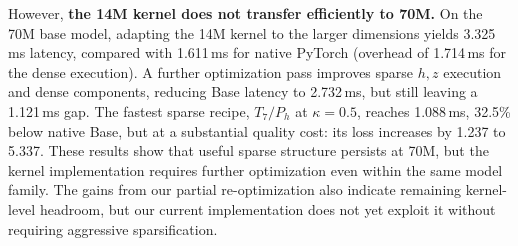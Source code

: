 However, \textbf{the 14M kernel does not transfer efficiently to 70M.}
On the 70M base model, adapting the 14M kernel to the larger dimensions yields 3.325\,ms latency, compared with 1.611\,ms for native PyTorch (overhead of 1.714\,ms for the dense execution). A further optimization pass improves sparse $h,z$ execution and dense components, reducing Base latency to 2.732\,ms, but still leaving a 1.121\,ms gap. The fastest sparse recipe, $T_7/P_h$ at $\kappa=0.5$, reaches 1.088\,ms, 32.5\% below native Base, but at a substantial quality cost: its loss increases by 1.237 to 5.337. These results show that useful sparse structure persists at 70M, but the kernel implementation requires further optimization even within the same model family. The gains from our partial re-optimization also indicate remaining kernel-level headroom, but our current implementation does not yet exploit it without requiring aggressive sparsification.

 

